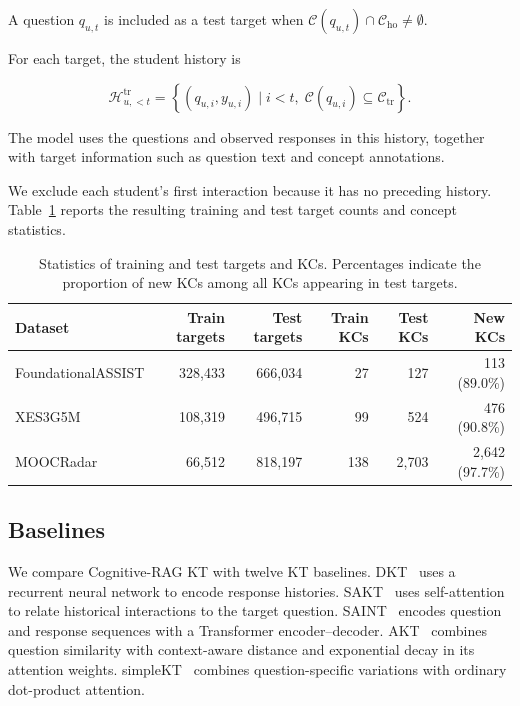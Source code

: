 \documentclass{llncs}
\begin{document}
A question $q_{u,t}$ is included as a test target when $\mathcal{C}(q_{u,t})\cap\mathcal{C}_{\mathrm{ho}}\neq\emptyset$.

For each target, the student history is

\[\mathcal{H}^{\mathrm{tr}}_{u,<t}=\left\{(q_{u,i},y_{u,i})\mid
i<t,\;\mathcal{C}(q_{u,i})\subseteq\mathcal{C}_{\mathrm{tr}}
\right\}.\]

The model uses the questions and observed responses in this history, together with target information such as question text and concept annotations.

We exclude each student's first interaction because it has no preceding history. Table~\ref{tab:cold‑start‑split‑statistics} reports the resulting training and test target counts and concept statistics.

\begin{table}[t]
\centering
\scriptsize
\setlength{\tabcolsep}{3pt}
\caption{Statistics of training and test targets and KCs. Percentages indicate the proportion of new KCs among all KCs appearing in test targets.}
\label{tab:cold‑start‑split‑statistics}
\begin{tabular}{lrrrrr}
\toprule
\textbf{Dataset} & \textbf{Train targets} & \textbf{Test targets} & \textbf{Train KCs} & \textbf{Test KCs} & \textbf{New KCs} \\
\midrule
FoundationalASSIST & 328,433 & 666,034 & 27 & 127 & 113 (89.0\%) \\
XES3G5M & 108,319 & 496,715 & 99 & 524 & 476 (90.8\%) \\
MOOCRadar & 66,512 & 818,197 & 138 & 2,703 & 2,642 (97.7\%) \\
\bottomrule
\end{tabular}
\end{table}

\subsection{Baselines}

We compare Cognitive-RAG KT with twelve KT baselines. DKT~\cite{piech2015deep} uses a recurrent neural network to encode response histories. SAKT~\cite{pandey2019sakt} uses self-attention to relate historical interactions to the target question. SAINT~\cite{choi2020saint} encodes question and response sequences with a Transformer encoder--decoder. AKT~\cite{ghosh2020akt} combines question similarity with context-aware distance and exponential decay in its attention weights. simpleKT~\cite{liu2023simplekt} combines question-specific variations with ordinary dot-product attention.
\end{document}
